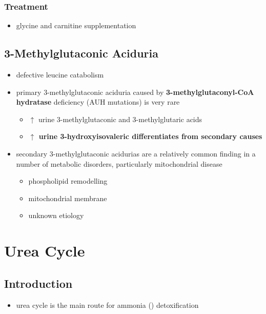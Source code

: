 \documentclass[12pt]{scrartcl}
\begin{document}
\subsubsection{Treatment}
\label{sec:orga81cae7}
\begin{itemize}
\item glycine and carnitine supplementation
\end{itemize}

\subsection{3-Methylglutaconic Aciduria}
\label{sec:orgd41e265}
\begin{itemize}
\item defective leucine catabolism
\item primary 3-methylglutaconic aciduria caused by \textbf{3-methylglutaconyl-CoA}
\textbf{hydratase} deficiency (AUH mutations) is very rare
\begin{itemize}
\item \(\uparrow\) urine 3-methylglutaconic and 3-methylglutaric acids
\item \textbf{\(\uparrow\) urine 3-hydroxyisovaleric differentiates from secondary causes}
\end{itemize}
\end{itemize}


\begin{itemize}
\item secondary 3-methylglutaconic acidurias are a relatively common finding in a
number of metabolic disorders, particularly mitochondrial disease
\begin{itemize}
\item phospholipid remodelling
\item mitochondrial membrane
\item unknown etiology
\end{itemize}
\end{itemize}

\section{Urea Cycle}
\label{sec:org828b4e5}
\subsection{Introduction}
\label{sec:orgc7ffbb1}
\begin{itemize}
\item urea cycle is the main route for ammonia () detoxification
\end{itemize}
\end{document}
